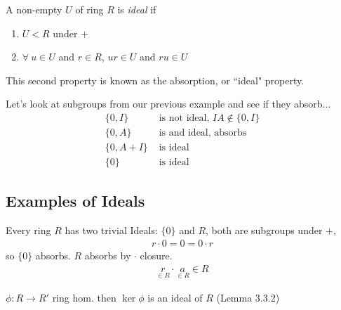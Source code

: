 \begin{definition}
    A non-empty $U$ of ring $R$ is \textit{ideal} if 
    \begin{enumerate}[label=\roman*)]
        \item $U<R$ under $+$
        \item $\forall \ u \in U$ and $r \in R$, $ur\in U$ and $ru\in U$
    \end{enumerate}
    This second property is known as the absorption, or ``ideal" property.
\end{definition}
Let's look at subgroups from our previous example and see if they absorb...
\begin{align}
    \{0,I\}& \text{ is not ideal, }IA\not\in \{0,I\} \nonumber \\
    \{0,A\}& \text{ is and ideal, absorbs} \nonumber \\
    \{0,A+I\}& \text{ is  ideal } \nonumber \\
    \{0\}& \text{ is ideal} \nonumber
\end{align}

\subsection*{Examples of Ideals}
\begin{example}
    Every ring $R$ has two trivial Ideals: $\{0\}$ and $R$, both are subgroups under $+$, 
    \begin{align}
        r\cdot 0 = 0 = 0\cdot r \nonumber
    \end{align}
    so $\{0\}$ absorbs. $R$ absorbs by $\cdot$ closure.
    \begin{align}
        \underset{\in R}{r}\cdot \underset{\in R}{a} \in R\nonumber
    \end{align}
\end{example}

\begin{example}
    $\phi : R \rightarrow R'$ ring hom. then $\ker \phi$ is an ideal of $R$ (Lemma 3.3.2)
\end{example}

